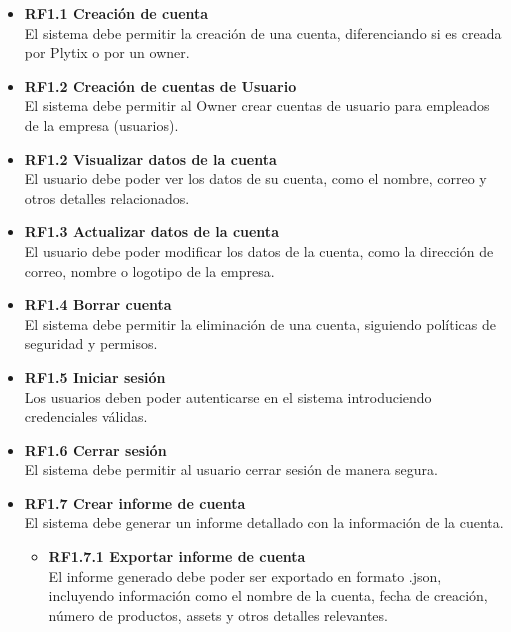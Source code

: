 \documentclass{article}
\begin{document}
\begin{itemize}
    \item \textbf{RF1.1 Creación de cuenta} \\
    El sistema debe permitir la creación de una cuenta, diferenciando si es creada por Plytix o por un owner.

    \item \textbf{RF1.2 Creación de cuentas de Usuario} \\
    El sistema debe permitir al Owner crear cuentas de usuario para empleados de la empresa (usuarios).

    \item \textbf{RF1.2 Visualizar datos de la cuenta} \\
    El usuario debe poder ver los datos de su cuenta, como el nombre, correo y otros detalles relacionados.

    \item \textbf{RF1.3 Actualizar datos de la cuenta} \\
    El usuario debe poder modificar los datos de la cuenta, como la dirección de correo, nombre o logotipo de la empresa.

    \item \textbf{RF1.4 Borrar cuenta} \\
    El sistema debe permitir la eliminación de una cuenta, siguiendo políticas de seguridad y permisos.

    \item \textbf{RF1.5 Iniciar sesión} \\
    Los usuarios deben poder autenticarse en el sistema introduciendo credenciales válidas.

    \item \textbf{RF1.6 Cerrar sesión} \\
    El sistema debe permitir al usuario cerrar sesión de manera segura.

    \item \textbf{RF1.7 Crear informe de cuenta} \\
    El sistema debe generar un informe detallado con la información de la cuenta.
    \begin{itemize}
        \item \textbf{RF1.7.1 Exportar informe de cuenta} \\
        El informe generado debe poder ser exportado en formato .json, incluyendo información como el nombre de la cuenta, fecha de creación, número de productos, assets y otros detalles relevantes.
    \end{itemize}


\end{itemize}
\end{document}
